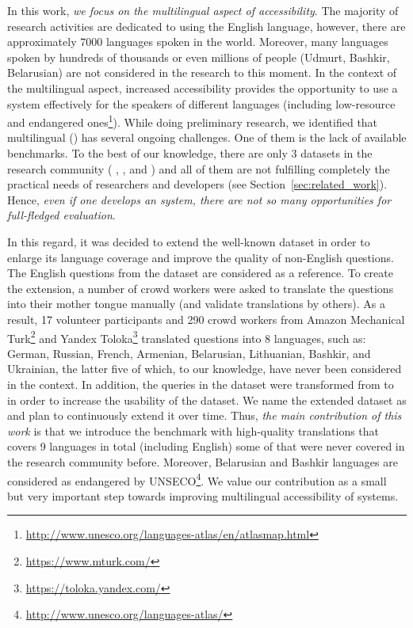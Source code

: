 \documentclass[conference]{IEEEtran}
\begin{document}
In this work, \emph{we focus on the multilingual aspect of accessibility}. 
The majority of research activities are dedicated to using the English language, however, there are approximately 7000 languages spoken in the world.
Moreover, many languages spoken by hundreds of thousands or even millions of people (\eg Udmurt, Bashkir, Belarusian) are not considered in the \KGQA research to this moment.
In the context of the multilingual aspect, increased accessibility provides the opportunity to use a \KGQA system effectively for the speakers of different languages (including low-resource and endangered ones\footnote{\cf \url{http://www.unesco.org/languages-atlas/en/atlasmap.html}}).
While doing preliminary research, we identified that multilingual \KGQA (\mKGQA) has several ongoing challenges. 
One of them is the lack of available benchmarks.
To the best of our knowledge, there are only 3 \mKGQA datasets in the research community ( \cite{QALD},  \cite{rubq20}, and \CWQ \cite{cui2021multilingual}) and all of them are not fulfilling completely the practical needs of researchers and developers (see Section~\ref{sec:related_work}).
Hence, \emph{even if one develops an \mKGQA system, there are not so many opportunities for full-fledged evaluation}. 
\begin{comment}
\begin{figure*}[t!]
    \centering
    \texttt{[image: img/translation-illustration.pdf]}
    \caption{Illustration of the translation process. TODO: redraw}
    \label{fig:translation-illustration}
\end{figure*}
\end{comment}
In this regard, it was decided to extend the well-known  dataset in order to enlarge its language coverage and improve the quality of non-English questions.
The English questions from the dataset are considered as a reference.
To create the extension, a number of crowd workers were asked to translate the questions into their mother tongue manually (and validate translations by others).
As a result, 17 volunteer participants and 290 crowd workers from Amazon Mechanical Turk\footnote{\url{https://www.mturk.com/}} and Yandex Toloka\footnote{\url{https://toloka.yandex.com/}} translated questions into 8 languages, such as: German, Russian, French, Armenian, Belarusian, Lithuanian, Bashkir, and Ukrainian, the latter five of which, to our knowledge, have never been considered in the \KGQA context.
In addition, the \SPARQL queries in the dataset were transformed from \DBpedia to \Wikidata in order to increase the usability of the dataset.
We name the extended dataset as \qq{\QALDplus} and plan to continuously extend it over time.
Thus, \emph{the main contribution of this work} is that we introduce the \mKGQA benchmark with high-quality translations that covers 9 languages in total (including English) some of that were never covered in the \KGQA research community before. 
Moreover, Belarusian and Bashkir languages are considered as endangered by UNSECO\footnote{\cf \url{http://www.unesco.org/languages-atlas/}}.
We value our contribution as a small but very important step towards improving multilingual accessibility of \KGQA systems.
\end{document}
